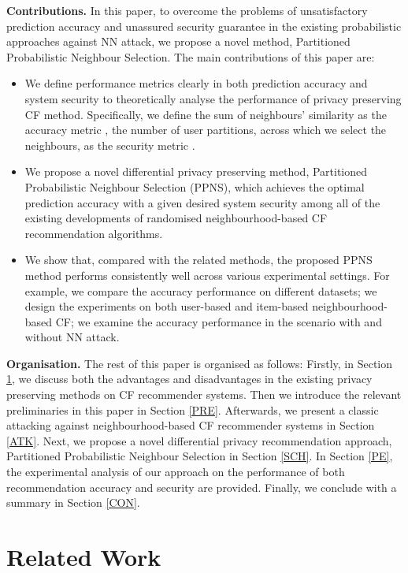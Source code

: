 \documentclass[11pt]{article}
\begin{document}
\textbf{Contributions.} In this paper, to overcome the problems of unsatisfactory prediction accuracy and unassured security guarantee in the existing probabilistic approaches against NN attack, we propose a novel method, Partitioned Probabilistic Neighbour Selection. The main contributions of this paper are:
\begin{itemize}
\item We define performance metrics clearly in both prediction accuracy and system security to theoretically analyse the performance of privacy preserving CF method. Specifically, we define the sum of  neighbours' similarity as the accuracy metric , the number of user partitions, across which we select the  neighbours, as the security metric .
\item We propose a novel differential privacy preserving method, Partitioned Probabilistic Neighbour Selection (PPNS), which achieves the optimal prediction accuracy  with a given desired system security  among all of the existing developments of randomised neighbourhood-based CF recommendation algorithms.
\item We show that, compared with the related methods, the proposed PPNS method performs consistently well across various experimental settings. For example, we compare the accuracy performance on different datasets; we design the experiments on both user-based and item-based neighbourhood-based CF; we examine the accuracy performance in the scenario with and without NN attack.
\end{itemize}
\textbf{Organisation.} The rest of this paper is organised as follows: Firstly, in Section \ref{RW}, we discuss both the advantages and disadvantages in the existing privacy preserving methods on CF recommender systems. Then we introduce the relevant preliminaries in this paper in Section \ref{PRE}. Afterwards, we present a classic attacking against neighbourhood-based CF recommender systems in Section \ref{ATK}. Next, we propose a novel differential privacy recommendation approach, Partitioned Probabilistic Neighbour Selection in Section \ref{SCH}. In Section \ref{PE}, the experimental analysis of our approach on the performance of both recommendation accuracy and security are provided. Finally, we conclude with a summary in Section \ref{CON}. 


\section{Related Work}
\label{RW}
\end{document}
